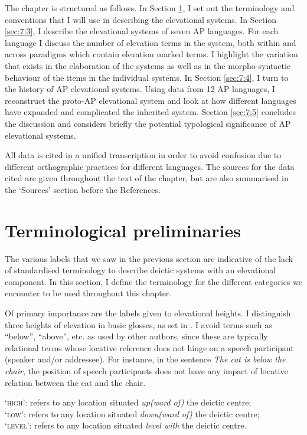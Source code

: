 \documentclass[output=paper]{LSP/langsci}
\begin{document}
The chapter is structured as follows. In Section \ref{sec:7:2}, I set out the terminology and conventions that I will use in describing the elevational systems. In Section \ref{sec:7:3}, I describe the elevational systems of seven AP languages. For each language I discuss the number of elevation terms in the system, both within and across paradigms which contain elevation marked terms. I highlight the variation that exists in the elaboration of the systems as well as in the morpho-syntactic behaviour of the items in the individual systems. In Section \ref{sec:7:4}, I turn to the history of AP elevational systems. Using data from 12 AP languages, I reconstruct the proto-AP elevational system and look at how different languages have expanded and complicated the inherited system. Section \ref{sec:7:5} concludes the discussion and considers briefly the potential typological significance of AP elevational systems.

All data is cited in a unified transcription in order to avoid confusion due to different orthographic practices for different languages. The sources for the data cited are given throughout the text of the chapter, but are also summarised in the `Sources' section before the References. 

\section{Terminological preliminaries}\label{sec:7:2}
The various labels that we saw in the previous section are indicative of the lack of standardised terminology to describe deictic systems with an elevational component. In this section, I define the terminology for the different categories we encounter to be used throughout this chapter. 

Of primary importance are the labels given to elevational heights. I distinguish three heights of elevation in basic glosses, as set in . I avoid terms such as ``below'', ``above'', etc. as used by other authors, since these are typically relational terms whose locative reference does not hinge on a speech participant (speaker and/or addressee). For instance, in the sentence \textit{The cat is below the chair}, the position of speech participants does not have any impact of locative relation between the cat and the chair. 




\ea \label{ex:7:1}
`\textsc{high}':   refers to any location situated \textit{up(ward of)} the deictic centre;\\
`\textsc{low}':   refers to any location situated \textit{down(ward of)} the deictic centre;\\
`\textsc{level}':  refers to any location situated \textit{level with} the deictic centre.\\ 
\z
\end{document}
